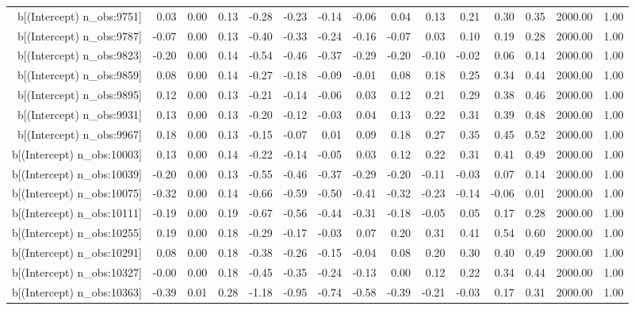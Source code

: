 \begin{table}[ht]
\begin{tabular}{rrrrrrrrrrrrrrr}
  b[(Intercept) n\_obs:9751] & 0.03 & 0.00 & 0.13 & -0.28 & -0.23 & -0.14 & -0.06 & 0.04 & 0.13 & 0.21 & 0.30 & 0.35 & 2000.00 & 1.00 \\ 
  b[(Intercept) n\_obs:9787] & -0.07 & 0.00 & 0.13 & -0.40 & -0.33 & -0.24 & -0.16 & -0.07 & 0.03 & 0.10 & 0.19 & 0.28 & 2000.00 & 1.00 \\ 
  b[(Intercept) n\_obs:9823] & -0.20 & 0.00 & 0.14 & -0.54 & -0.46 & -0.37 & -0.29 & -0.20 & -0.10 & -0.02 & 0.06 & 0.14 & 2000.00 & 1.00 \\ 
  b[(Intercept) n\_obs:9859] & 0.08 & 0.00 & 0.14 & -0.27 & -0.18 & -0.09 & -0.01 & 0.08 & 0.18 & 0.25 & 0.34 & 0.44 & 2000.00 & 1.00 \\ 
  b[(Intercept) n\_obs:9895] & 0.12 & 0.00 & 0.13 & -0.21 & -0.14 & -0.06 & 0.03 & 0.12 & 0.21 & 0.29 & 0.38 & 0.46 & 2000.00 & 1.00 \\ 
  b[(Intercept) n\_obs:9931] & 0.13 & 0.00 & 0.13 & -0.20 & -0.12 & -0.03 & 0.04 & 0.13 & 0.22 & 0.31 & 0.39 & 0.48 & 2000.00 & 1.00 \\ 
  b[(Intercept) n\_obs:9967] & 0.18 & 0.00 & 0.13 & -0.15 & -0.07 & 0.01 & 0.09 & 0.18 & 0.27 & 0.35 & 0.45 & 0.52 & 2000.00 & 1.00 \\ 
  b[(Intercept) n\_obs:10003] & 0.13 & 0.00 & 0.14 & -0.22 & -0.14 & -0.05 & 0.03 & 0.12 & 0.22 & 0.31 & 0.41 & 0.49 & 2000.00 & 1.00 \\ 
  b[(Intercept) n\_obs:10039] & -0.20 & 0.00 & 0.13 & -0.55 & -0.46 & -0.37 & -0.29 & -0.20 & -0.11 & -0.03 & 0.07 & 0.14 & 2000.00 & 1.00 \\ 
  b[(Intercept) n\_obs:10075] & -0.32 & 0.00 & 0.14 & -0.66 & -0.59 & -0.50 & -0.41 & -0.32 & -0.23 & -0.14 & -0.06 & 0.01 & 2000.00 & 1.00 \\ 
  b[(Intercept) n\_obs:10111] & -0.19 & 0.00 & 0.19 & -0.67 & -0.56 & -0.44 & -0.31 & -0.18 & -0.05 & 0.05 & 0.17 & 0.28 & 2000.00 & 1.00 \\ 
  b[(Intercept) n\_obs:10255] & 0.19 & 0.00 & 0.18 & -0.29 & -0.17 & -0.03 & 0.07 & 0.20 & 0.31 & 0.41 & 0.54 & 0.60 & 2000.00 & 1.00 \\ 
  b[(Intercept) n\_obs:10291] & 0.08 & 0.00 & 0.18 & -0.38 & -0.26 & -0.15 & -0.04 & 0.08 & 0.20 & 0.30 & 0.40 & 0.49 & 2000.00 & 1.00 \\ 
  b[(Intercept) n\_obs:10327] & -0.00 & 0.00 & 0.18 & -0.45 & -0.35 & -0.24 & -0.13 & 0.00 & 0.12 & 0.22 & 0.34 & 0.44 & 2000.00 & 1.00 \\ 
  b[(Intercept) n\_obs:10363] & -0.39 & 0.01 & 0.28 & -1.18 & -0.95 & -0.74 & -0.58 & -0.39 & -0.21 & -0.03 & 0.17 & 0.31 & 2000.00 & 1.00 \\ 

\end{tabular}
\end{table}
